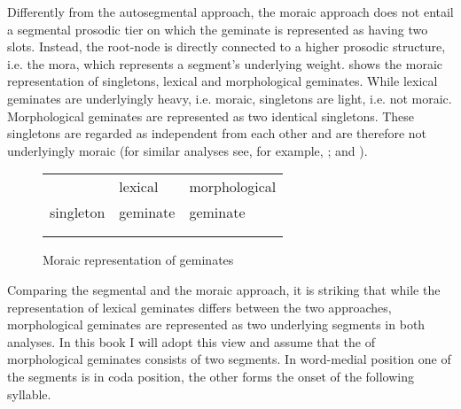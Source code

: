 Differently from the autosegmental approach, the moraic approach does not entail a segmental prosodic tier on which the geminate is represented as having two slots. Instead, the root-node is directly connected to a higher prosodic structure, i.e. the mora, which represents a segment's underlying weight.  shows the {moraic representation} of singletons, lexical and  morphological geminates. While  lexical geminates are underlyingly heavy, i.e. moraic, singletons are light, i.e. not moraic. Morphological geminates are represented as two identical singletons. These singletons are regarded as independent from each other and are therefore not underlyingly moraic  (for similar analyses see, for example,  \citealt[14]{Ham.2001}; \citealt[17]{Davis.2014} and \citealt{Davis.2017}).


\begin{figure} [h]
	\centering
	
	
	\begin{tabularx}{.8\linewidth}{YYY}
		
		&		lexical			 & 		 morphological \\
		
		singleton	&			  geminate	 & 			  geminate\\		
		\\
		\begin{tikzpicture}
		\Tree [.C  ] 					
		\end{tikzpicture}												&
		
		
		\begin{tikzpicture}[grow'=up]
		\Tree  [.C $\mu$ ]
		\end{tikzpicture}			
		&
		
		\begin{tikzpicture}[grow'=up]
		\Tree  [.C ]
		\end{tikzpicture}
		\begin{tikzpicture}[grow'=up]
		\Tree  [.C  ]
		\end{tikzpicture}		
		
	\end{tabularx}
	
	\caption{Moraic representation of geminates} 
	\label{fig:Moraic representation of geminates}
\end{figure}


Comparing the segmental and the moraic approach, it is striking that while the representation of  lexical geminates differs between the two approaches,  morphological geminates are represented as two underlying segments in both analyses.
In this book I will adopt this view and assume that the  of  morphological geminates consists of two segments. In word-medial position one of the segments is in coda position, the other forms the onset of the following syllable. 


